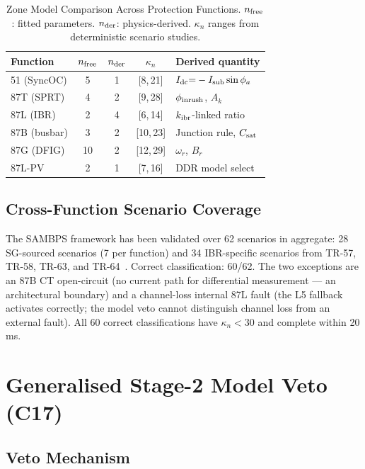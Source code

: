 \documentclass[journal,twoside]{IEEEtran}
\begin{document}
\begin{table}[h]
  \centering
  \caption{Zone Model Comparison Across Protection Functions.
    $n_{\rm free}$: fitted parameters.  $n_{\rm der}$: physics-derived.
    $\kappa_n$ ranges from deterministic scenario studies.}
  \label{tab:models}
  \small
  \begin{tabular}{@{}lcccp{2.3cm}@{}}
    \toprule
    Function & $n_{\rm free}$ & $n_{\rm der}$ & $\kappa_n$ & Derived quantity \\
    \midrule
    51 (SyncOC)   & 5 & 1 & [8,\,21]  & $I_{\rm dc}{=}-I_{\rm sub}\sin\phi_a$ \\
    87T (SPRT)    & 4 & 2 & [9,\,28]  & $\phi_{\rm inrush}$, $A_k$ \\
    87L (IBR)     & 2 & 4 & [6,\,14]  & $k_{\rm ibr}$-linked ratio \\
    87B (busbar)  & 3 & 2 & [10,\,23] & Junction rule, $C_{\rm sat}$ \\
    87G (DFIG)    & 10 & 2 & [12,\,29] & $\omega_r$, $B_r$ \\
    87L-PV        & 2 & 1 & [7,\,16]  & DDR model select \\
    \bottomrule
  \end{tabular}
\end{table}

\subsection{Cross-Function Scenario Coverage}

The SAMBPS framework has been validated over 62 scenarios in aggregate: 28
SG-sourced scenarios (7 per function) and 34 IBR-specific scenarios from TR-57,
TR-58, TR-63, and TR-64~\cite{SAMBP_TR65}.
Correct classification: 60/62.
The two exceptions are an 87B CT open-circuit (no current path for differential
measurement --- an architectural boundary) and a channel-loss internal 87L fault
(the L5 fallback activates correctly; the model veto cannot distinguish channel
loss from an external fault).
All 60 correct classifications have $\kappa_n < 30$ and complete within 20\,ms.

\section{Generalised Stage-2 Model Veto (C17)}
\label{sec:veto}

\subsection{Veto Mechanism}
\end{document}
